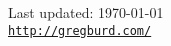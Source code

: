 \documentclass[letterpaper]{article}
\def\footerlink{http://gregburd.com/}
\begin{document}
\bigskip

\begin{center}
  \begin{footnotesize}
    Last updated: \today \\
    \href{\footerlink}{\texttt{\footerlink}}
  \end{footnotesize}
\end{center}
\end{document}
